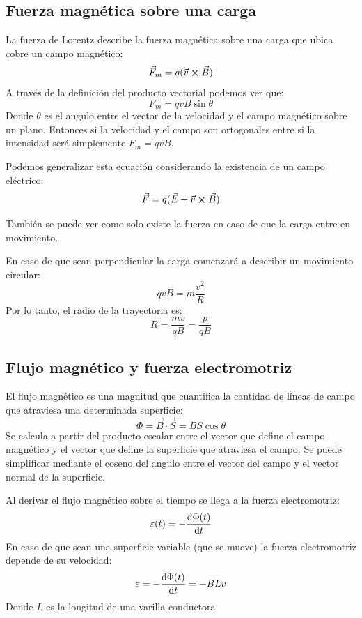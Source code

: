 \documentclass[arial,a4paper,print]{article}
\begin{document}
\subsection{Fuerza magnética sobre una carga}
La fuerza de Lorentz describe la fuerza magnética sobre una carga que ubica cobre un campo magnético:
\begin{equation*}
	\vec{F}_{m} = q(\vec{v}\cross\vec{B})
\end{equation*}
A través de la definición del producto vectorial podemos ver que:
\begin{equation*}
	F_{m} = qvB\sin\theta 
\end{equation*}
Donde $\theta$ es el angulo entre el vector de la velocidad y el campo magnético sobre un plano.
Entonces si la velocidad y el campo son ortogonales entre si la intensidad será simplemente $F_{m}=qvB$. 

Podemos generalizar esta ecuación considerando la existencia de un campo eléctrico:
\begin{equation*}
	\vec{F} = q(\vec{E} + \vec{v}\cross\vec{B})
\end{equation*}

También se puede ver como solo existe la fuerza en caso de que la carga entre en movimiento.

En caso de que sean perpendicular la carga comenzará a describir un movimiento circular:
\begin{equation*}
	qvB=m\frac{v^{2}}{R}
\end{equation*}
Por lo tanto, el radio de la trayectoria es:
\begin{equation*}
	R=\frac{mv}{qB} = \frac{p}{qB}
\end{equation*}

\subsection{Flujo magnético y fuerza electromotriz}

El flujo magnético es una magnitud que cuantifica la cantidad de líneas de campo que atraviesa una determinada superficie:
\begin{equation*}
	\Phi = \vec{B}\cdot\vec{S} = BS\cos\theta
\end{equation*}
Se calcula a partir del producto escalar entre el vector que define el campo magnético y el vector que define la superficie que atraviesa el campo. Se puede simplificar mediante el coseno del angulo entre el vector del campo y el vector normal de la superficie. 

Al derivar el flujo magnético sobre el tiempo se llega a la fuerza electromotriz:
\begin{equation*}
	\varepsilon(t) = -\dv{\Phi(t)}{t}
\end{equation*}
En caso de que sean una superficie variable (que se mueve) la fuerza electromotriz depende de su velocidad:
\begin{equation*}
	\varepsilon = -\dv{\Phi(t)}{t} = -BLv
\end{equation*}
Donde $L$ es la longitud de una varilla conductora.
\end{document}
